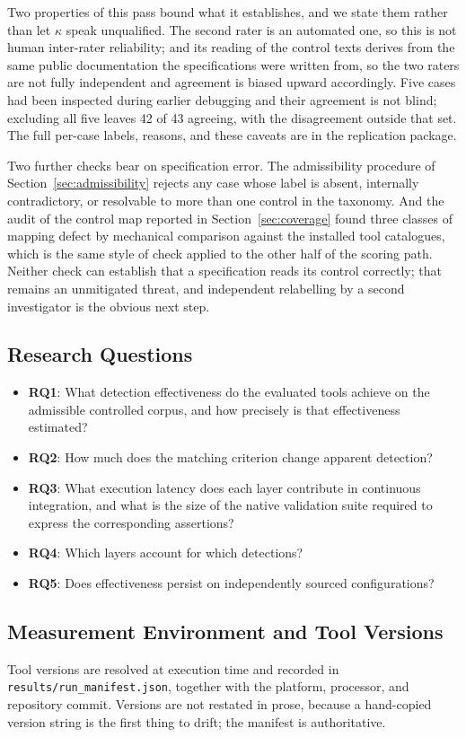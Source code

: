 \documentclass[journal]{IEEEtran}
\begin{document}
Two properties of this pass bound what it establishes, and we state them rather
than let $\kappa$ speak unqualified. The second rater is an automated one, so this
is not human inter-rater reliability; and its reading of the control texts derives
from the same public documentation the specifications were written from, so the two
raters are not fully independent and agreement is biased upward accordingly. Five cases had been
inspected during earlier debugging and their agreement is not blind; excluding all
five leaves 42 of 43 agreeing, with the disagreement outside that set. The full
per-case labels, reasons, and these caveats are in the replication package.

Two further checks bear on specification error. The
admissibility procedure of Section~\ref{sec:admissibility} rejects any case whose
label is absent, internally contradictory, or resolvable to more than one control
in the taxonomy. And the audit of the control map reported in
Section~\ref{sec:coverage} found three classes of mapping defect by mechanical
comparison against the installed tool catalogues, which is the same style of check
applied to the other half of the scoring path. Neither check can establish that a
specification reads its control correctly; that remains an unmitigated threat, and
independent relabelling by a second investigator is the obvious next step.

\subsection{Research Questions}
\begin{itemize}
\item \textbf{RQ1}: What detection effectiveness do the evaluated tools achieve
on the admissible controlled corpus, and how precisely is that effectiveness
estimated?
\item \textbf{RQ2}: How much does the matching criterion change apparent
detection?
\item \textbf{RQ3}: What execution latency does each layer contribute in
continuous integration, and what is the size of the native validation suite
required to express the corresponding assertions?
\item \textbf{RQ4}: Which layers account for which detections?
\item \textbf{RQ5}: Does effectiveness persist on independently sourced
configurations?
\end{itemize}

\subsection{Measurement Environment and Tool Versions}
Tool versions are resolved at execution time and recorded in
\texttt{results/run\_manifest.json}, together with the platform, processor, and
repository commit. Versions are not restated in prose, because a hand-copied
version string is the first thing to drift; the manifest is authoritative.
\end{document}
